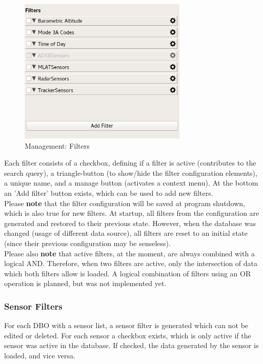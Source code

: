 \documentclass[10pt,letterpaper,extrafontsizes]{memoir}
\begin{document}
\begin{figure}[H]
  \center
    \includegraphics[width=8cm]{../screenshots/management_filters.png}
  \caption{Management: Filters}
  \label{fig:management_filters}
\end{figure}

Each filter consists of a checkbox, defining if a filter is active (contributes to the search query), a triangle-button (to show/hide the filter configuration elements), a unique name, and a manage button (activates a context menu). At the bottom an 'Add filter' button exists, which can be used to add new filters. \\

Please \textbf{note} that the filter configuration will be saved at program shutdown, which is also true for new
filters.   At  startup,  all  filters  from  the  configuration  are  generated  and  restored  to  their  previous  state. However, when the database was changed (usage of different data source), all filters are reset to an initial
state (since their previous configuration may be senseless). \\

Please also \textbf{note} that active filters, at the moment, are always combined with a logical AND. Therefore,
when  two  filters  are  active,  only  the  intersection  of  data  which  both  filters  allow  is  loaded.   A  logical combination of filters using an OR operation is planned, but was not implemented yet.

\subsubsection{Sensor Filters}
For each DBO with a sensor list, a sensor filter is generated which can not be edited or deleted.  For each
sensor a checkbox exists, which is only active if the sensor was active in the database.  If checked, the
data generated by the sensor is loaded, and vice versa.
\end{document}
